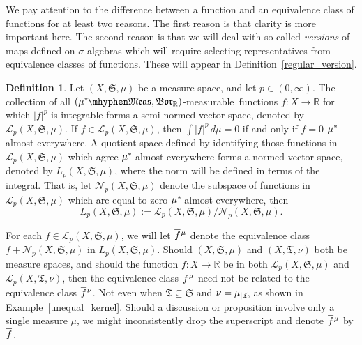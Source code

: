 \documentclass[
twoside=true,
paper=letter,
fontsize=11pt,
pagesize=auto,
leqno,
openany,
headsepline,
overfullrule,
]{scrbook}
\theoremstyle{plain}
\theoremstyle{plain}
\theoremstyle{definition}
\newtheorem{defn}[thm]{Definition}
\theoremstyle{bfnoteitalic}
\theoremstyle{bfnoteroman}
\newcommand{\sigalg}[1]{\mathfrak{#1}}
\newcommand{\cali}[1]{\mathscr{#1}}
\newcommand{\borel}{\mathfrak{Bor}}
\newcommand{\textsigma}{\hbox{\large{$\sigma$}}\kern-1pt}
\newcommand{\restrictedto}[1]{_{\lvert#1}\kern-1.5pt}
\newcommand{\abs}[1]{\left\vert#1\right\vert}
\newcommand{\R}{\mathbb{R}}
\newcommand{\semiring}{\sigalg{S}}
\newcommand{\semiringii}{\sigalg{T}}
\newcommand{\measurable}[1]{{#1}\mhyphen\mathfrak{Meas}}
\newcommand{\kernast}{\ast\kern-1pt}
\newcommand{\mbmeasurable}{$(\measurable{\measure^\kernast},\borel_\R)$\hyp{}measurable}
\newcommand{\measurespace}{X}
\newcommand{\measure}{\mu}
\newcommand{\measureii}{\nu}
\newcommand*\xbar[1]{%
   \hbox{%
     \vbox{%
       \hrule height 0.4pt %
       \kern0.4ex%
       \hbox{%
         \ensuremath{#1}%
       }%
     }%
   }%
}
\newcommand{\lebclass}[1]{\hspace{.5pt}\xbar{#1}\hspace{0.5pt}}
\newcommand{\ellclass}[2]{\lebclass{#1}^{#2}}
\begin{document}
We pay attention to the difference between a function and an equivalence class of functions for at least two reasons.  The first reason is that  clarity is more important here.  The second reason is that we will deal with so-called \emph{versions} of maps defined on \textsigma-algebras which will require selecting representatives from equivalence classes of functions. These will appear in Definition~\ref{regular_version}.


\begin{defn}\label{Lp}
Let $(\measurespace, \semiring, \measure)$ be a measure space, and let $p \in (0, \infty)$.
The collection of all \mbmeasurable\ functions $f:\measurespace\to\R$ for which $\abs{f}^p$ is integrable forms a semi-normed vector space, denoted by 
$\cali{L}_p(\measurespace, \semiring, \measure)$.
\index{Lp@$L_p(\measurespace, \semiring, \measure)$}
If $f\in\cali{L}_p(\measurespace, \semiring, \measure)$, then $\int\abs{f}^p\,d\measure=0$ if and only if $f = 0$ $\measure^\kernast$-almost everywhere.
A quotient space defined by identifying those functions in $\cali{L}_p(\measurespace, \semiring, \measure)$ which agree $\measure^\kernast$-almost everywhere forms a normed vector space, denoted by $L_p(\measurespace, \semiring, \measure)$, where the norm will be defined in terms of the integral. That is, let 
$\cali{N}_p(\measurespace, \semiring, \measure)$ denote the subspace of functions in 
$\cali{L}_p(\measurespace, \semiring, \measure)$ which are equal to zero $\measure^\kernast$-almost everywhere, then
\[
L_p(\measurespace, \semiring, \measure) :=
\cali{L}_p(\measurespace, \semiring, \measure)/
\cali{N}_p(\measurespace, \semiring, \measure).
\]


For each $f\in\cali{L}_p(\measurespace, \semiring, \measure)$, we will let $\ellclass{f}{\measure}$ denote the equivalence class $f + \cali{N}_p(\measurespace, \semiring, \measure)$ in 
$L_p(\measurespace, \semiring, \measure)$.  Should $(\measurespace, \semiring, \measure)$ and $(\measurespace, \semiringii, \measureii)$
both be measure spaces, and should the function $f:\measurespace\to\R$ be in  both 
$\cali{L}_p(\measurespace, \semiring, \measure)$ and
$\cali{L}_p(\measurespace, \semiringii, \measureii)$,
then the equivalence class $\ellclass{f}{\measure}$ need not be related to the equivalence class  
$\ellclass{f}{\measureii}$.
Not even when $\semiringii\subseteq\semiring$ and $\measureii=\measure\restrictedto{\semiringii}$, as shown in Example~\ref{unequal_kernel}.
Should a discussion or proposition involve only a single measure $\mu$, we might inconsistently drop the superscript and denote
$\ellclass{f}{\mu}$ by $\lebclass{f}$.


\end{defn}
\end{document}
